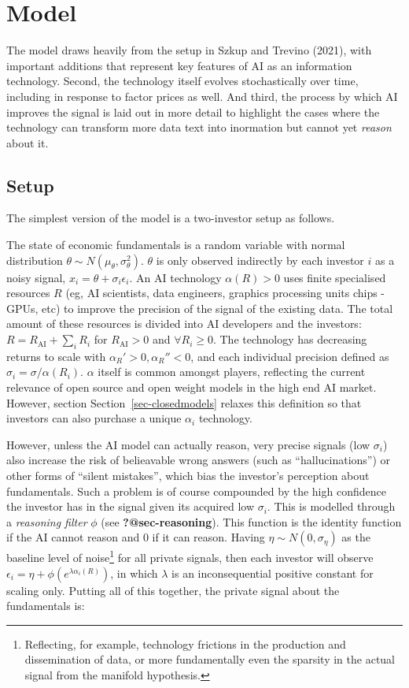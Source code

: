 \documentclass[
]{article}
\theoremstyle{plain}
\theoremstyle{remark}
\begin{document}
\section{Model}\label{model}

The model draws heavily from the setup in Szkup and Trevino (2021), with
important additions that represent key features of AI as an information
technology. Second, the technology itself evolves stochastically over
time, including in response to factor prices as well. And third, the
process by which AI improves the signal is laid out in more detail to
highlight the cases where the technology can transform more data text
into inormation but cannot yet \emph{reason} about it.

\subsection{Setup}\label{setup}

The simplest version of the model is a two-investor setup as follows.

The state of economic fundamentals is a random variable with normal
distribution \(\theta \sim N(\mu_\theta, \sigma_\theta^2)\). \(\theta\)
is only observed indirectly by each investor \(i\) as a noisy signal,
\(x_i = \theta + \sigma_i \epsilon_i\). An AI technology
\(\alpha(R) > 0\) uses finite specialised resources \(R\) (eg, AI
scientists, data engineers, graphics processing units chips - GPUs, etc)
to improve the precision of the signal of the existing data. The total
amount of these resources is divided into AI developers and the
investors: \(R = R_{\text{AI}} + \sum_{i} R_i\) for
\(R_{\text{AI}} > 0\) and \(\forall R_i \geq 0\). The technology has
decreasing returns to scale with \(\alpha_R' > 0, \alpha_R'' < 0\), and
each individual precision defined as
\(\sigma_i = \sigma / \alpha(R_i)\). \(\alpha\) itself is common amongst
players, reflecting the current relevance of open source and open weight
models in the high end AI market. However, section
Section~\ref{sec-closedmodels} relaxes this definition so that investors
can also purchase a unique \(\alpha_i\) technology.

However, unless the AI model can actually reason, very precise signals
(low \(\sigma_i\)) also increase the risk of belieavable wrong answers
(such as ``hallucinations'') or other forms of ``silent mistakes'',
which bias the investor's perception about fundamentals. Such a problem
is of course compounded by the high confidence the investor has in the
signal given its acquired low \(\sigma_i\). This is modelled through a
\emph{reasoning filter} \(\phi\) (see \textbf{?@sec-reasoning}). This
function is the identity function if the AI cannot reason and 0 if it
can reason. Having \(\eta \sim N(0, \sigma_\eta)\) as the baseline level
of noise\footnote{Reflecting, for example, technology frictions in the
  production and dissemination of data, or more fundamentally even the
  sparsity in the actual signal from the manifold hypothesis.} for all
private signals, then each investor will observe
\(\epsilon_i = \eta + \phi(e^{\lambda \alpha_i(R)})\), in which
\(\lambda\) is an inconsequential positive constant for scaling only.
Putting all of this together, the private signal about the fundamentals
is:
\end{document}
